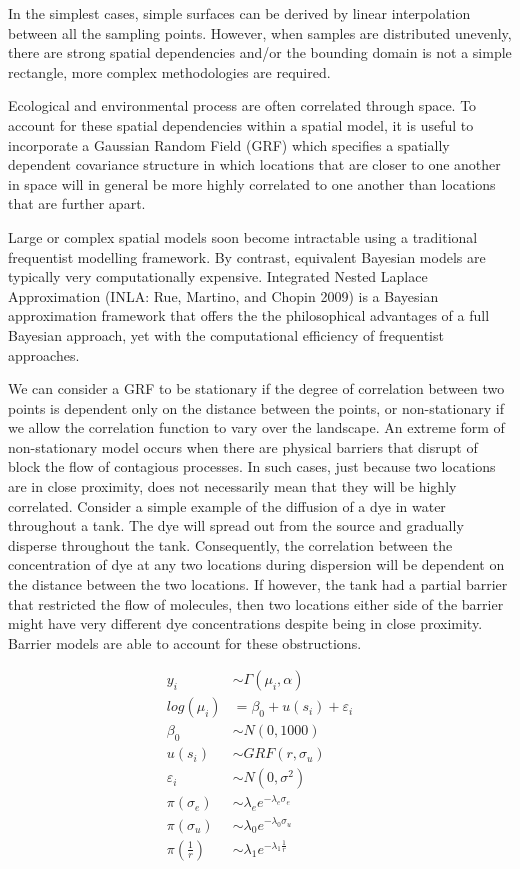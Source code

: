 \documentclass[a4paper]{article}
\begin{document}
In the simplest cases, simple surfaces can be derived by linear
interpolation between all the sampling points. However, when samples are
distributed unevenly, there are strong spatial dependencies and/or the
bounding domain is not a simple rectangle, more complex methodologies
are required.

Ecological and environmental process are often correlated through space.
To account for these spatial dependencies within a spatial model, it is
useful to incorporate a Gaussian Random Field (GRF) which specifies a
spatially dependent covariance structure in which locations that are
closer to one another in space will in general be more highly correlated
to one another than locations that are further apart.

Large or complex spatial models soon become intractable using a
traditional frequentist modelling framework. By contrast, equivalent
Bayesian models are typically very computationally expensive. Integrated
Nested Laplace Approximation (INLA: Rue, Martino, and Chopin 2009) is a
Bayesian approximation framework that offers the the philosophical
advantages of a full Bayesian approach, yet with the computational
efficiency of frequentist approaches.

We can consider a GRF to be stationary if the degree of correlation
between two points is dependent only on the distance between the points,
or non-stationary if we allow the correlation function to vary over the
landscape. An extreme form of non-stationary model occurs when there are
physical barriers that disrupt of block the flow of contagious
processes. In such cases, just because two locations are in close
proximity, does not necessarily mean that they will be highly
correlated. Consider a simple example of the diffusion of a dye in water
throughout a tank. The dye will spread out from the source and gradually
disperse throughout the tank. Consequently, the correlation between the
concentration of dye at any two locations during dispersion will be
dependent on the distance between the two locations. If however, the
tank had a partial barrier that restricted the flow of molecules, then
two locations either side of the barrier might have very different dye
concentrations despite being in close proximity. Barrier models are able
to account for these obstructions.

\[
\begin{align}
y_i &\sim{} \Gamma(\mu_i, \alpha)\\
log(\mu_i) &= \beta_0 + u(s_i) + \varepsilon_i\\[1em]
\beta_0 &\sim{} N(0,1000)\\
u(s_i) &\sim{} GRF(r, \sigma_u)\\ 
\varepsilon_i &\sim{} N(0, \sigma^2)\\[1em]
\pi(\sigma_e) &\sim{} \lambda_e e^{-\lambda_e \sigma_e}\\
\pi(\sigma_u) &\sim{} \lambda_0 e^{-\lambda_0 \sigma_u}\\
\pi\left(\frac{1}{r}\right) & \sim{} \lambda_1 e^{-\lambda_1 \frac{1}{r}}
\end{align}
\]
\end{document}
